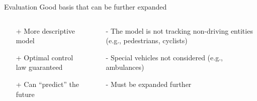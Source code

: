 \begin{frame}{Evaluation}
	\hspace{0.5cm} Good basis that can be further expanded
	\vspace{0.5cm}
	\begin{columns}
		\begin{column}{0.35\textwidth}
			
			\begin{itemize}
				\item[+] More descriptive model
				\item[+] Optimal control law guaranteed
				\item[+] Can ``predict'' the future
			\end{itemize}
		\end{column}
		\vline
		\hspace{0.8cm}
		\begin{column}{0.4\textwidth}
			\begin{itemize}
				\item[-] The model is not tracking non-driving entities (e.g., pedestrians, cyclists)
				\item[-] Special vehicles not considered (e.g., ambulances)
				\item[-] Must be expanded further
			\end{itemize}
		\end{column}
	\end{columns}
\end{frame}



